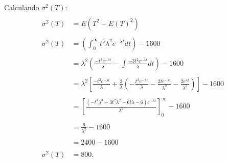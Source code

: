 \documentclass{article}
\begin{document}
Calculando $\sigma^{2}(T)$:
		\begin{equation}
		\begin{array}{ll}
		     &  \\
		\sigma^{2}(T) & = E(T^{2} - E(T)^{2})\\
		 &  \\
	\sigma^{2}(T)	& = (\int_{0}^{\infty} t^3\lambda^2  e^{-\lambda t} dt)- 1600\\
		 &  \\
   &	= \lambda^{2}\left( \frac{-t^{3}e^{-\lambda t}}{\lambda} - \int \frac{-3t^{2}e^{-\lambda t}}{\lambda}dt\right) -1600\\
	 &  \\
	& = \lambda^{2}\left[ \frac{-t^{3}e^{-\lambda t}}{\lambda} + \frac{3}{\lambda}\left( - \frac{t^{2}e^{-\lambda t}}{\lambda} - \frac{2 t e^{-\lambda t}}{\lambda^{2}} - \frac{2e^{\lambda t}}{\lambda^{3}}\right) \right]-1600 \\
	 &  \\
	& = \left[ \frac{\left( -t^{3}\lambda^{3} - 3t^{2}\lambda^{2} - 6t\lambda-6\right) e^{-\lambda t}}{\lambda^{2}} \right] ^{\infty}_{0}-1600\\
	 &  \\
	 & = \frac{6}{\lambda^{2}}-1600\\
	  &  \\
	& = 2400 - 1600\\
	&  \\
	\sigma^{2}(T)	&  = 800.
					\end{array}	
\end{equation}

   
\newpage


\end{document}
